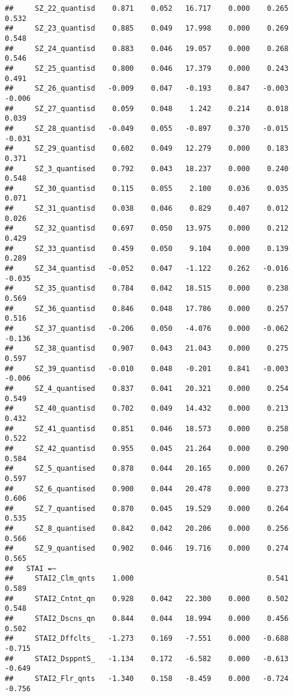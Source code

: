 \documentclass[]{article}
\begin{document}
\begin{verbatim}
##     SZ_22_quantisd    0.871    0.052   16.717    0.000    0.265    0.532
##     SZ_23_quantisd    0.885    0.049   17.998    0.000    0.269    0.548
##     SZ_24_quantisd    0.883    0.046   19.057    0.000    0.268    0.546
##     SZ_25_quantisd    0.800    0.046   17.379    0.000    0.243    0.491
##     SZ_26_quantisd   -0.009    0.047   -0.193    0.847   -0.003   -0.006
##     SZ_27_quantisd    0.059    0.048    1.242    0.214    0.018    0.039
##     SZ_28_quantisd   -0.049    0.055   -0.897    0.370   -0.015   -0.031
##     SZ_29_quantisd    0.602    0.049   12.279    0.000    0.183    0.371
##     SZ_3_quantised    0.792    0.043   18.237    0.000    0.240    0.548
##     SZ_30_quantisd    0.115    0.055    2.100    0.036    0.035    0.071
##     SZ_31_quantisd    0.038    0.046    0.829    0.407    0.012    0.026
##     SZ_32_quantisd    0.697    0.050   13.975    0.000    0.212    0.429
##     SZ_33_quantisd    0.459    0.050    9.104    0.000    0.139    0.289
##     SZ_34_quantisd   -0.052    0.047   -1.122    0.262   -0.016   -0.035
##     SZ_35_quantisd    0.784    0.042   18.515    0.000    0.238    0.569
##     SZ_36_quantisd    0.846    0.048   17.786    0.000    0.257    0.516
##     SZ_37_quantisd   -0.206    0.050   -4.076    0.000   -0.062   -0.136
##     SZ_38_quantisd    0.907    0.043   21.043    0.000    0.275    0.597
##     SZ_39_quantisd   -0.010    0.048   -0.201    0.841   -0.003   -0.006
##     SZ_4_quantised    0.837    0.041   20.321    0.000    0.254    0.549
##     SZ_40_quantisd    0.702    0.049   14.432    0.000    0.213    0.432
##     SZ_41_quantisd    0.851    0.046   18.573    0.000    0.258    0.522
##     SZ_42_quantisd    0.955    0.045   21.264    0.000    0.290    0.584
##     SZ_5_quantised    0.878    0.044   20.165    0.000    0.267    0.597
##     SZ_6_quantised    0.900    0.044   20.478    0.000    0.273    0.606
##     SZ_7_quantised    0.870    0.045   19.529    0.000    0.264    0.535
##     SZ_8_quantised    0.842    0.042   20.206    0.000    0.256    0.566
##     SZ_9_quantised    0.902    0.046   19.716    0.000    0.274    0.565
##   STAI =~                                                               
##     STAI2_Clm_qnts    1.000                               0.541    0.589
##     STAI2_Cntnt_qn    0.928    0.042   22.300    0.000    0.502    0.548
##     STAI2_Dscns_qn    0.844    0.044   18.994    0.000    0.456    0.502
##     STAI2_Dffclts_   -1.273    0.169   -7.551    0.000   -0.688   -0.715
##     STAI2_DsppntS_   -1.134    0.172   -6.582    0.000   -0.613   -0.649
##     STAI2_Flr_qnts   -1.340    0.158   -8.459    0.000   -0.724   -0.756

\end{verbatim}
\end{document}

